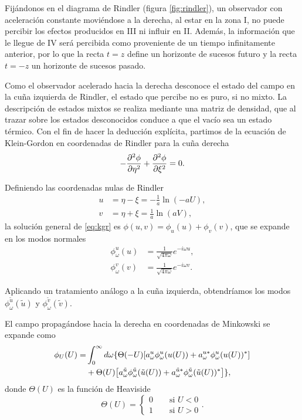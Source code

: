 Fijándonos en el diagrama de Rindler (figura \ref{fig:rindler}),
un observador con aceleración constante moviéndose a la derecha, al estar en la zona I,  no puede percibir los 
efectos producidos  en III ni influir en II. 
Además, la información que le llegue de IV será percibida como proveniente de un tiempo
infinitamente anterior, por lo que la recta $t=z$ define un horizonte de sucesos futuro y 
la recta $t=-z$ un horizonte de sucesos pasado.

Como el observador acelerado hacia la derecha desconoce el estado del campo en la 
cuña izquierda de Rindler, el estado que percibe no es puro, si no mixto.
La descripción de estados mixtos se realiza mediante una matriz de densidad, que al trazar
sobre los estados desconocidos conduce a que el vacío sea un estado térmico.
Con el fin de hacer la deducción explícita, partimos de la ecuación de Klein-Gordon en
coordenadas de Rindler para la cuña derecha
\begin{equation}
  -\pdv[2]{\phi}{\eta}+\pdv[2]{\phi}{\xi} = 0.
  \label{eq:kgr}
\end{equation}

Definiendo las coordenadas nulas de Rindler 
  \begin{align}
    u&=\eta-\xi=-\frac{1}{a}\ln(-aU)\label{eq:coorind} ,\\
    v&=\eta+\xi=\frac{1}{a}\ln(aV), 
  \end{align}
la solución general de \ref{eq:kgr} es $\phi(u,v)=\phi_u(u)+\phi_v(v)$, que se expande en los
modos normales
\begin{equation}
  \begin{aligned}
    \phi^u_\omega(u) &=\frac{1}{\sqrt{4\pi\omega}}e^{-i\omega u},\\
    \phi^v_\omega(v) &=\frac{1}{\sqrt{4\pi\omega}}e^{-i\omega v}.
  \end{aligned}
\end{equation}

Aplicando un tratamiento análogo a la cuña izquierda, obtendríamos los modos $\phi^{\tilde u}_\omega(\tilde u)$
y $\phi^{\tilde v}_\omega(\tilde v)$.

El campo propagándose hacia la derecha en coordenadas de Minkowski se expande como
\begin{equation}
  \begin{aligned}
    \phi_U(U)=&\int_0^\infty d\omega \{\Theta(-U)\qty[a^u_\omega \phi^u_\omega(u(U))+a_\omega^{u*}\phi_\omega^u(u(U))^*] \\
    &+\Theta(U)\qty[a^{\tilde u}_\omega \phi^{\tilde u}_\omega(\tilde u(U))+a_\omega^{\tilde u*}\phi_\omega^{\tilde u}(\tilde u(U))^*]\},
  \end{aligned}
\end{equation}
donde $\Theta(U)$ es la función de Heaviside 
\begin{equation}
   \Theta(U)=
  \begin{cases}
    0\qquad \text{si }U<0 \\
    1\qquad \text{si }U>0
  \end{cases}
  .
\end{equation}

